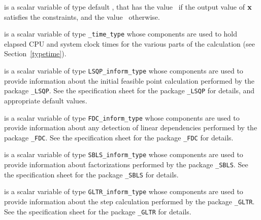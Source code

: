 \begin{description}
 is a scalar variable of type default \logical, that has the
value \true\ if the output value of ${\mathbf{x}}$ satisfies the constraints,
and the value \false\ otherwise.

 is a scalar variable of type {\tt \packagename\_time\_type} 
whose components are used to hold elapsed CPU  and system clock 
times for the various parts of the calculation (see Section~\ref{typetime}).

 is a scalar variable of type 
{\tt LSQP\_inform\_type}
whose components are used to provide information about the 
initial feasible point calculation
performed by the package 
{\tt \libraryname\_LSQP}. 
See the specification sheet for the package 
{\tt \libraryname\_LSQP} 
for details, and appropriate default values.

 is a scalar variable of type 
{\tt FDC\_inform\_type}
whose components are used to provide information about 
any detection of linear dependencies
performed by the package 
{\tt \libraryname\_FDC}. 
See the specification sheet for the package 
{\tt \libraryname\_FDC} for details.

 is a scalar variable of type 
{\tt SBLS\_inform\_type}
whose components are used to provide information about factorizations
performed by the package 
{\tt \libraryname\_SBLS}. 
See the specification sheet for the package 
{\tt \libraryname\_SBLS} for details.

 is a scalar variable of type 
{\tt GLTR\_inform\_type}
whose components are used to provide information about the step calculation
performed by the package 
{\tt \libraryname\_GLTR}. 
See the specification sheet for the package 
{\tt \libraryname\_GLTR} 
for details.

\end{description}

